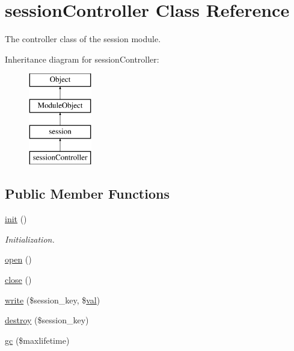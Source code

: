 \hypertarget{classsessionController}{}\section{session\+Controller Class Reference}
\label{classsessionController}


The controller class of the session module.  


Inheritance diagram for session\+Controller\+:\begin{figure}[H]
\begin{center}
\leavevmode
\includegraphics[height=4.000000cm]{classsessionController}
\end{center}
\end{figure}
\subsection*{Public Member Functions}
\begin{DoxyCompactItemize}
\item 
\hyperlink{classsessionController_a36dc0e81503442a6f77d7d96ab7b5eba}{init} ()
\begin{DoxyCompactList}\small\item\em Initialization. \end{DoxyCompactList}\item 
\hyperlink{classsessionController_a6d695e575646db3c90300eb6da7eb69d}{open} ()
\item 
\hyperlink{classsessionController_af48b21176f7a2d12c859bb8421e04f82}{close} ()
\item 
\hyperlink{classsessionController_a05f09c961d684c81c6b192fff5005407}{write} (\$session\+\_\+key, \$\hyperlink{ckeditor_2js_2xe__interface_8js_a4fb96abdf073a439bca5e051c333b35d}{val})
\item 
\hyperlink{classsessionController_a695f52cca73bf4fc0efb1d35a79023c6}{destroy} (\$session\+\_\+key)
\item 
\hyperlink{classsessionController_a38ec9eb8d466cbf0191b35f69cd2f960}{gc} (\$maxlifetime)
\end{DoxyCompactItemize}
